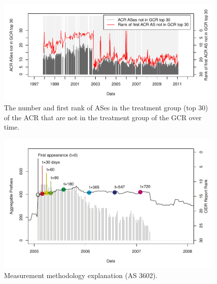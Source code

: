 \begin{figure}
    \includegraphics[width=6in]{figures/cidr_report_validity_top30_error.pdf}
    \caption{The number and first rank of ASes in the treatment group (top 30) of the ACR that are not in the treatment group of the GCR over time.}
\end{figure}

\begin{figure}
    \includegraphics[width=6in]{figures/single_as.pdf}
    \caption{Measurement methodology explanation (AS 3602).}
\end{figure}

